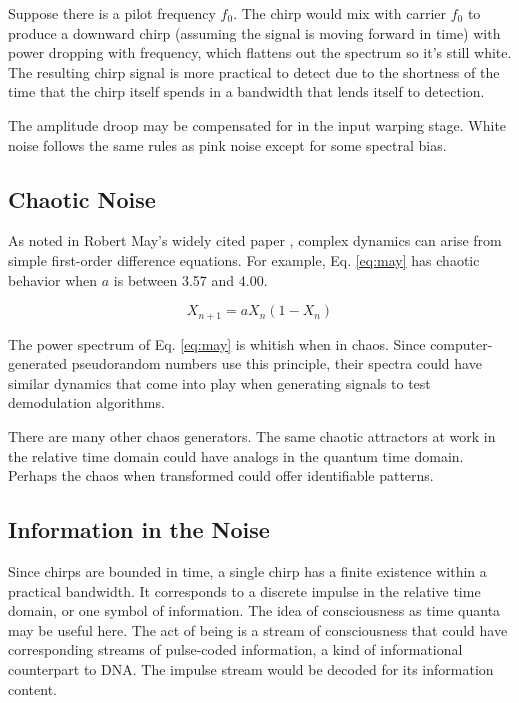 Suppose there is a pilot frequency $f_0$.
The chirp would mix with carrier $f_0$ to produce a downward chirp
(assuming the signal is moving forward in time)
with power dropping with frequency,
which flattens out the spectrum so it's still white.
The resulting chirp signal is more practical to detect due to the shortness of the
time that the chirp itself spends in a bandwidth that lends itself to detection.

The amplitude droop may be compensated for in the input warping stage.
White noise follows the same rules as pink noise except for some spectral bias.

\subsection{Chaotic Noise}

As noted in Robert May's widely cited paper \cite{May},
complex dynamics can arise from simple first-order difference equations.
For example, Eq. \ref{eq:may} has chaotic behavior when $a$ is between
3.57 and 4.00.

\begin{equation} \label{eq:may}
X_{n + 1} = aX_n(1 - X_n)
\end{equation}

The power spectrum of Eq. \ref{eq:may} is whitish when in chaos.
Since computer-generated pseudorandom numbers use this principle, their spectra
could have similar dynamics that come into play when generating signals to test
demodulation algorithms.

There are many other chaos generators.
The same chaotic attractors at work in the relative time domain could have
analogs in the quantum time domain. Perhaps the chaos when transformed could offer
identifiable patterns.

\subsection{Information in the Noise}

Since chirps are bounded in time, a single chirp has a finite
existence within a practical bandwidth. 
It corresponds to a discrete impulse in the relative time domain,
or one symbol of information.
The idea of consciousness as time quanta may be useful here.
The act of being is a stream of consciousness that could have corresponding
streams of pulse-coded information, a kind of informational counterpart to DNA.
The impulse stream would be decoded for its information content.

